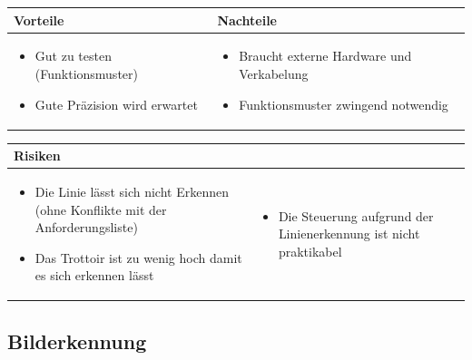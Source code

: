 \begin{table}[h]
\begin{tabular}{p{} | p{}}


 \textbf{Vorteile} & \textbf{Nachteile} \\ \hline
	 
\begin{itemize}
\item Gut zu testen (Funktionsmuster)
\item Gute Präzision wird erwartet
\end{itemize}

 
 &
 
\begin{itemize}
\item Braucht externe Hardware und Verkabelung
\item Funktionsmuster zwingend notwendig
\end{itemize}

\end{tabular}
\end{table}

\begin{table}[h]
\begin{tabular}{p{}p{}}

 \textbf{Risiken} & \\ \hline
	 
\begin{itemize}
\item Die Linie lässt sich nicht Erkennen (ohne Konflikte mit der Anforderungsliste)
\item Das Trottoir ist zu wenig hoch damit es sich erkennen lässt
\end{itemize}
&
\begin{itemize}
\item Die Steuerung aufgrund der Linienerkennung ist nicht praktikabel
\end{itemize}

 
\end{tabular}
\end{table}

\pagebreak


\subsection{Bilderkennung}

